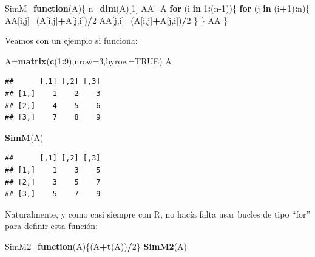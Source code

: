 \documentclass[]{book}
\newenvironment{Shaded}{\begin{snugshade}}{\end{snugshade}}
\newcommand{\ControlFlowTok}[1]{\textcolor[rgb]{0.13,0.29,0.53}{\textbf{#1}}}
\newcommand{\DataTypeTok}[1]{\textcolor[rgb]{0.13,0.29,0.53}{#1}}
\newcommand{\DecValTok}[1]{\textcolor[rgb]{0.00,0.00,0.81}{#1}}
\newcommand{\KeywordTok}[1]{\textcolor[rgb]{0.13,0.29,0.53}{\textbf{#1}}}
\newcommand{\NormalTok}[1]{#1}
\newcommand{\OperatorTok}[1]{\textcolor[rgb]{0.81,0.36,0.00}{\textbf{#1}}}
\newcommand{\OtherTok}[1]{\textcolor[rgb]{0.56,0.35,0.01}{#1}}
\theoremstyle{definition}
\theoremstyle{definition}
\theoremstyle{definition}
\theoremstyle{remark}
\begin{document}
\begin{Shaded}
\begin{Highlighting}[]
\NormalTok{SimM=}\ControlFlowTok{function}\NormalTok{(A)\{}
\NormalTok{  n=}\KeywordTok{dim}\NormalTok{(A)[}\DecValTok{1}\NormalTok{]}
\NormalTok{  AA=A}
  \ControlFlowTok{for}\NormalTok{ (i }\ControlFlowTok{in} \DecValTok{1}\OperatorTok{:}\NormalTok{(n}\DecValTok{-1}\NormalTok{))\{}
    \ControlFlowTok{for}\NormalTok{ (j }\ControlFlowTok{in}\NormalTok{ (i}\OperatorTok{+}\DecValTok{1}\NormalTok{)}\OperatorTok{:}\NormalTok{n)\{}
\NormalTok{      AA[i,j]=(A[i,j]}\OperatorTok{+}\NormalTok{A[j,i])}\OperatorTok{/}\DecValTok{2}
\NormalTok{      AA[j,i]=(A[i,j]}\OperatorTok{+}\NormalTok{A[j,i])}\OperatorTok{/}\DecValTok{2}
\NormalTok{    \}}
\NormalTok{  \}}
\NormalTok{AA}
\NormalTok{\}}
\end{Highlighting}
\end{Shaded}

Veamos con un ejemplo si funciona:

\begin{Shaded}
\begin{Highlighting}[]
\NormalTok{A=}\KeywordTok{matrix}\NormalTok{(}\KeywordTok{c}\NormalTok{(}\DecValTok{1}\OperatorTok{:}\DecValTok{9}\NormalTok{),}\DataTypeTok{nrow=}\DecValTok{3}\NormalTok{,}\DataTypeTok{byrow=}\OtherTok{TRUE}\NormalTok{)}
\NormalTok{A}
\end{Highlighting}
\end{Shaded}

\begin{verbatim}
##      [,1] [,2] [,3]
## [1,]    1    2    3
## [2,]    4    5    6
## [3,]    7    8    9
\end{verbatim}

\begin{Shaded}
\begin{Highlighting}[]
\KeywordTok{SimM}\NormalTok{(A)}
\end{Highlighting}
\end{Shaded}

\begin{verbatim}
##      [,1] [,2] [,3]
## [1,]    1    3    5
## [2,]    3    5    7
## [3,]    5    7    9
\end{verbatim}

Naturalmente, y como casi siempre con R, no hacía falta usar bucles de tipo ``for'' para definir esta función:

\begin{Shaded}
\begin{Highlighting}[]
\NormalTok{SimM2=}\ControlFlowTok{function}\NormalTok{(A)\{(A}\OperatorTok{+}\KeywordTok{t}\NormalTok{(A))}\OperatorTok{/}\DecValTok{2}\NormalTok{\}}
\KeywordTok{SimM2}\NormalTok{(A)}
\end{Highlighting}
\end{Shaded}
\end{document}
